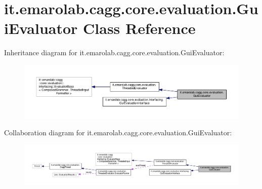 \hypertarget{classit_1_1emarolab_1_1cagg_1_1core_1_1evaluation_1_1GuiEvaluator}{\section{it.\-emarolab.\-cagg.\-core.\-evaluation.\-Gui\-Evaluator Class Reference}
\label{classit_1_1emarolab_1_1cagg_1_1core_1_1evaluation_1_1GuiEvaluator}
}


Inheritance diagram for it.\-emarolab.\-cagg.\-core.\-evaluation.\-Gui\-Evaluator\-:\nopagebreak
\begin{figure}[H]
\begin{center}
\leavevmode
\includegraphics[width=350pt]{classit_1_1emarolab_1_1cagg_1_1core_1_1evaluation_1_1GuiEvaluator__inherit__graph}
\end{center}
\end{figure}


Collaboration diagram for it.\-emarolab.\-cagg.\-core.\-evaluation.\-Gui\-Evaluator\-:\nopagebreak
\begin{figure}[H]
\begin{center}
\leavevmode
\includegraphics[width=350pt]{classit_1_1emarolab_1_1cagg_1_1core_1_1evaluation_1_1GuiEvaluator__coll__graph}
\end{center}
\end{figure}
